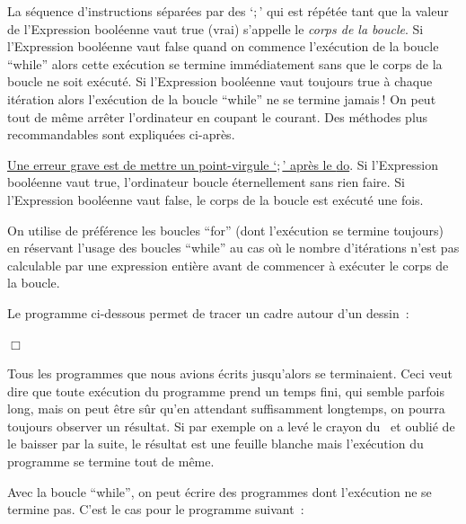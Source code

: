 \noindent La  séquence d'instructions séparées par des `$;$' qui est répétée tant que la valeur de
l'{Expression booléenne} vaut {\idt true} (vrai) s'appelle le {\em corps de
la boucle}. Si l'{Expression booléenne}  vaut {\idt false} quand on commence l'exécution de la
boucle ``while'' alors cette exécution se termine immédiatement sans que le corps de la boucle ne soit
exécuté. Si l'{Expression booléenne}  vaut toujours {\idt true} à chaque itération
alors l'exécution de la boucle ``while'' ne se termine jamais$\:$! 
On peut tout de même arrêter l'ordinateur en coupant le courant. Des méthodes plus re\-com\-man\-da\-bles sont expliquées
ci-après. 

\underline{Une erreur grave est de mettre un point-virgule 
`{\idt $;$}' après le {\mcl do}}. Si l'Ex\-pres\-sion booléenne vaut {\idt true}, l'ordinateur boucle éternellement sans 
rien faire. Si l'Expression booléenne vaut {\idt false}, le corps de la boucle est exécuté une fois.

On utilise de préférence les boucles ``for'' (dont l'exécution se termine toujours) en réservant
l'usage des boucles ``while'' au cas où le nombre d'ité\-ra\-tions n'est pas calculable par une expression entière avant de 
commencer à exécuter le corps de la boucle.

\begin{exemple}[Cadre]{\rm Le programme ci-dessous permet de tracer un ca\-dre au\-tour d'un dessin~:

 {\raggedright 

 \vspace{0.4cm}
 
 
 \vspace{0.4cm}
 

 }
\noindent $\Box$ }\end{exemple}

Tous les programmes que nous avions écrits jusqu'alors se terminaient. Ceci veut dire que
 toute exécution du programme prend un temps fini, qui semble parfois long, mais on peut être sûr qu'en attendant suffisamment 
 longtemps, on pourra toujours
 observer un résultat. Si par exemple on a levé le crayon du \robot\ et oublié  de le baisser
 par la suite, le résultat est une feuille blanche mais l'exécution du programme se termine tout de
 même.
 
 Avec la boucle ``while'', on peut écrire des programmes dont l'exécution ne se termine pas.  C'est
 le cas pour le programme suivant~:
 
